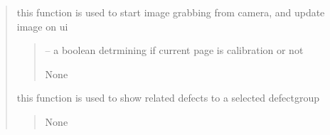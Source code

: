 \documentclass[letterpaper,10pt,english]{sphinxmanual}
\begin{document}
\begin{quote}
\begin{savenotes}
\begin{fulllineitems}
\begin{savenotes}
\begin{fulllineitems}
\begin{quote}
\begin{description}
\end{description}\end{quote}

\end{fulllineitems}\end{savenotes}


\begin{savenotes}\begin{fulllineitems}
\label{\detokenize{setting/setting_api:oxin.setting_api.API.show_camera_picture}}
\pysigstartsignatures
{}
\pysigstopsignatures
\sphinxAtStartPar
this function is used to start image grabbing from camera, and update image on ui
\begin{quote}\begin{description}
\sphinxAtStartPar
{} – a boolean detrmining if current page is calibration or not

\sphinxAtStartPar
None

\end{description}\end{quote}

\end{fulllineitems}\end{savenotes}


\begin{savenotes}\begin{fulllineitems}
\label{\detokenize{setting/setting_api:oxin.setting_api.API.show_related_defects}}
\pysigstartsignatures
{}
\pysigstopsignatures
\sphinxAtStartPar
this function is used to show related defects to a selected defect\sphinxhyphen{}group
\begin{quote}\begin{description}
\sphinxAtStartPar
None

\end{description}\end{quote}


\end{fulllineitems}
\end{savenotes}
\end{fulllineitems}
\end{savenotes}
\end{quote}
\end{document}
